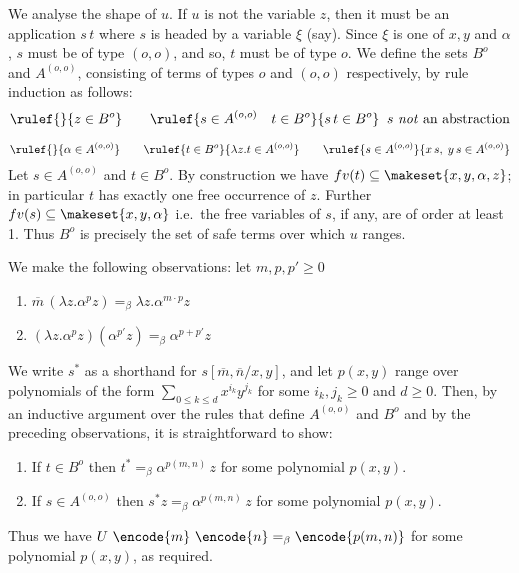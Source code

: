 We analyse the shape of $u$. If $u$ is not the variable $z$, then it must be an application $s \, t$ where $s$ is headed by a variable $\xi$ (say). Since $\xi$ is one of $x, y$ and $\alpha$, $s$ must be of type $(o, o)$, and so, $t$ must be of type $o$. We define the sets $B^o$ and $A^{(o, o)}$, consisting of terms of types $o$ and $(o, o)$ respectively, by rule induction as follows:
$$\rulef{}{z \in B^o} \qquad \rulef{s \in A^{(o, o)} \quad t \in B^o}{s \, t \in B^o}\;\;\hbox{$s$ \emph{not} an abstraction}$$

$$\rulef{}{\alpha \in A^{(o, o)}} \qquad \rulef{t \in B^o}{\lambda z.t \in A^{(o,o)}}\qquad\rulef{s \in A^{(o,o)}}{x \, s, \; y \, s \in A^{(o,o)}}$$
Let $s \in A^{(o, o)}$ and $t \in B^o$. By construction we have $fv(t) \subseteq \makeset{x, y, \alpha, z}$; in particular $t$ has exactly one free occurrence of $z$. Further $fv(s) \subseteq \makeset{x, y, \alpha}$ i.e.~the free variables of $s$, if any, are of order at least 1. Thus $B^o$ is precisely the set of safe terms over which $u$ ranges.

We make the following observations: let $m, p, p' \geq 0$
\begin{enumerate}
\item ${\overline m} \, (\lambda z.\alpha^p z) =_\beta \lambda z . \alpha^{m \cdot p} z$
\item $(\lambda z.\alpha^p z) (\alpha^{p'} z) =_\beta \alpha^{p + p'} z$
\end{enumerate}
We write $s^\ast$ as a shorthand for $s[\overline m, \overline n / x, y]$, and
let $p(x,y)$ range over polynomials of the form $\sum_{0\leq k \leq d} x^{i_k} y^{j_k}$ for some $i_k,j_k \geq 0$ and $d \geq 0$. Then, by an inductive argument over the rules that define $A^{(o,o)}$ and $B^o$ and by the preceding observations, it is straightforward to show:
\begin{enumerate}
\item If $t \in B^o$ then $t^\ast
=_\beta \alpha^{{p(m, n)}} \, z$ for some polynomial $p(x, y)$.
\item If $s \in A^{(o, o)}$ then $s^\ast z =_\beta \alpha^{{p(m, n)}} \, z$ for some polynomial $p(x, y)$.
\end{enumerate}

Thus we have $U~\encode{m}~\encode{n} =_\beta \encode{p(m,n)}$ for some polynomial $p(x, y)$, as required. 